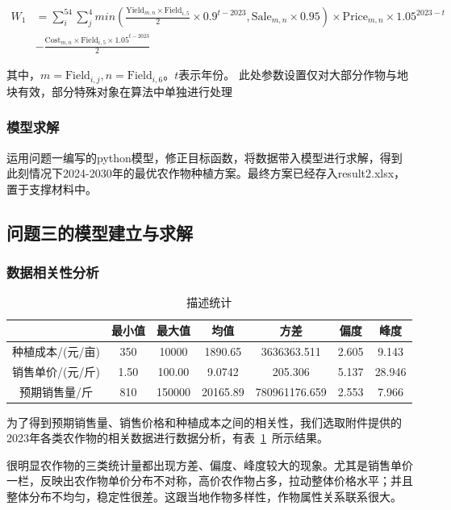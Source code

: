 \documentclass{cumcmthesis}
\begin{document}
\begin{equation*}
	\begin{split}
	W_1&=\sum_{i}^{54} \sum_{j}^{4}min(\frac{ \text{Yield}_{m,n} \times \text{Field}_{i,5}}{2}\times 0.9^{t-2023} ,\text{Sale}_{m,n}\times 0.95
	)\times \text{Price}_{m,n}\times 1.05^{2023-t}\\
	&-\frac{ \text{Cost}_{m,n}\times \text{Field}_{i,5}\times 1.05^{t-2023}}{2}   
	\end{split}
\end{equation*}	

其中，$m=\text{Field}_{i,j},n=\text{Field}_{i,6}$。$t$表示年份。
此处参数设置仅对大部分作物与地块有效，部分特殊对象在算法中单独进行处理

\subsubsection{模型求解}
运用问题一编写的python模型，修正目标函数，将数据带入模型进行求解，得到此刻情况下2024-2030年的最优农作物种植方案。最终方案已经存入result2.xlsx，置于支撑材料中。

\subsection{问题三的模型建立与求解}
\subsubsection{数据相关性分析}
\begin{table}[!htbp]
	\caption{描述统计}\label{tab003} \centering
	\begin{tabular}{|c|c|c|c|c|c|c|} 
		\hline
		& 最小值  & 最大值    & 均值           & 方差            & 偏度     & 峰度\\ 
		\hline
		种植成本/(元/亩) & 350  & 10000  & 1890.65   & 3636363.511   & 2.605  &9.143\\ 
		\hline
		销售单价/(元/斤) & 1.50 & 100.00 & 9.0742    & 205.306       & 5.137  &28.946\\ 
		\hline
		预期销售量/斤    & 810  & 150000 & 20165.89  & 780961176.659 & 2.553  &7.966\\
		\hline
	\end{tabular}
\end{table}

为了得到预期销售量、销售价格和种植成本之间的相关性，我们选取附件提供的2023年各类农作物的相关数据进行数据分析，有表~\ref{tab003}~所示结果。

很明显农作物的三类统计量都出现方差、偏度、峰度较大的现象。尤其是销售单价一栏，反映出农作物单价分布不对称，高价农作物占多，拉动整体价格水平；并且整体分布不均匀，稳定性很差。这跟当地作物多样性，作物属性关系联系很大。
\end{document}

